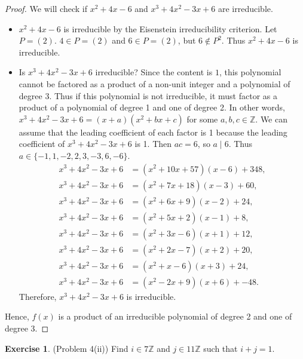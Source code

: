 \documentclass[12pt, psamsfonts]{amsart}
\theoremstyle{definition}
\newtheorem*{exer}{Exercise}
\theoremstyle{remark}
\numberwithin{equation}{section}
\begin{document}
\begin{proof}
  We will check if $x^2 + 4x - 6$ and $x^3 + 4x^2 - 3x + 6$ are irreducible.
  \begin{itemize}
    \item
      $x^2 + 4x - 6$ is irreducible by the Eisenstein irreducibility criterion.
      Let $P = (2)$.
      $4 \in P = (2)$ and $6 \in P = (2)$, but $6 \notin P^2$.
      Thus $x^2 + 4x - 6$ is irreducible.
    \item
      Is $x^3 + 4x^2 - 3x + 6$ irreducible?
      Since the content is $1$, this polynomial cannot be factored as a product of a non-unit integer and a polynomial of degree 3.
      Thus if this polynomial is not irreducible, it must factor as a product of a polynomial of degree 1 and one of degree 2.
      In other words, $x^3 + 4x^2 - 3x + 6 = (x + a)(x^2 + bx + c)$ for some $a, b, c \in \mathbb{Z}$.
      We can assume that the leading coefficient of each factor is 1 because the leading coefficient of $x^3 + 4x^2 - 3x + 6$ is 1.
      Then $ac = 6$, so $a \mid 6$.
      Thus $a \in \{ -1, 1, -2, 2, 3, -3, 6, -6 \}$.
      \begin{align*}
        x^3 + 4x^2 - 3x + 6 &= (x^{2} + 10 x + 57)(x - 6) + 348, \\
        x^3 + 4x^2 - 3x + 6 &= (x^{2} + 7 x + 18)(x - 3) + 60, \\
        x^3 + 4x^2 - 3x + 6 &= (x^{2} + 6 x + 9)(x - 2) + 24, \\
        x^3 + 4x^2 - 3x + 6 &= (x^{2} + 5 x + 2)(x - 1) + 8, \\
        x^3 + 4x^2 - 3x + 6 &= (x^{2} + 3 x - 6)(x + 1) + 12, \\
        x^3 + 4x^2 - 3x + 6 &= (x^{2} + 2 x - 7)(x + 2) + 20, \\
        x^3 + 4x^2 - 3x + 6 &= (x^{2} + x - 6)(x + 3) + 24, \\
        x^3 + 4x^2 - 3x + 6 &= (x^{2} - 2 x + 9)(x + 6) + -48.
      \end{align*}
      Therefore, $x^3 + 4x^2 - 3x + 6$ is irreducible.
  \end{itemize}
  Hence, $f(x)$ is a product of an irreducible polynomial of degree 2 and one of degree 3.
\end{proof}

\begin{exer}{(Problem 4(ii))}
  Find $i \in 7\mathbb{Z}$ and $j \in 11\mathbb{Z}$ such that $i + j = 1$.
\end{exer}
\end{document}

